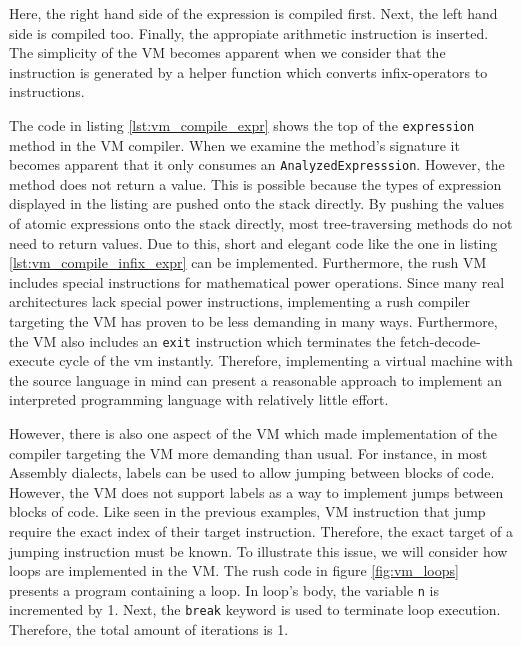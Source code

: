 
Here, the right hand side of the expression is compiled first.
Next, the left hand side is compiled too.
Finally, the appropiate arithmetic instruction is inserted.
The simplicity of the VM becomes apparent when we consider that the instruction is generated by a helper function which converts infix-operators to instructions.


The code in listing \ref{lst:vm_compile_expr} shows the top of the \texttt{expression} method in the VM compiler.
When we examine the method's signature it becomes apparent that it only consumes an \texttt{AnalyzedExpresssion}.
However, the method does not return a value.
This is possible because the types of expression displayed in the listing are pushed onto the stack directly.
By pushing the values of atomic expressions onto the stack directly, most tree-traversing methods do not need to return values.
Due to this, short and elegant code like the one in listing \ref{lst:vm_compile_infix_expr} can be implemented.
Furthermore, the rush VM includes special instructions for mathematical power operations.
Since many real architectures lack special power instructions, implementing a rush compiler targeting the VM has proven to be less demanding in many ways.
Furthermore, the VM also includes an \texttt{exit} instruction which terminates the fetch-decode-execute cycle of the vm instantly.
Therefore, implementing a virtual machine with the source language in mind can present a reasonable approach to implement an interpreted programming language with relatively little effort.

However, there is also one aspect of the VM which made implementation of the compiler targeting the VM more demanding than usual.
For instance, in most Assembly dialects, labels can be used to allow jumping between blocks of code.
However, the VM does not support labels as a way to implement jumps between blocks of code.
Like seen in the previous examples, VM instruction that jump require the exact index of their target instruction.
Therefore, the exact target of a jumping instruction must be known.
To illustrate this issue, we will consider how loops are implemented in the VM.
The rush code in figure \ref{fig:vm_loops} presents a program containing a loop.
In loop's body, the variable \texttt{n} is incremented by 1.
Next, the \texttt{break} keyword is used to terminate loop execution.
Therefore, the total amount of iterations is 1.


